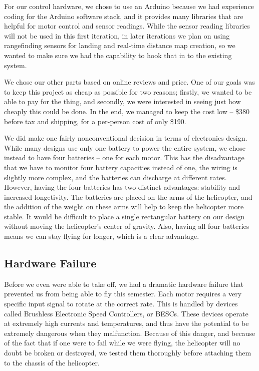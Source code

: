 For our control hardware, we chose to use an Arduino because we had
experience coding for the Arduino software stack, and it provides many
libraries that are helpful for motor control and sensor
readings. While the sensor reading libraries will not be used in this
first iteration, in later iterations we plan on using rangefinding
sensors for landing and real-time distance map creation, so we wanted
to make sure we had the capability to hook that in to the existing
system.

We chose our other parts based on online reviews and price. One of our
goals was to keep this project as cheap as possible for two reasons;
firstly, we wanted to be able to pay for the thing, and secondly, we
were interested in seeing just how cheaply this could be done. In the
end, we managed to keep the cost low -- \$380 before tax and shipping,
for a per-person cost of only \$190.

We did make one fairly nonconventional decision in terms of
electronics design. While many designs use only one battery to power
the entire system, we chose instead to have four batteries -- one for
each motor. This has the disadvantage that we have to monitor four
battery capacities instead of one, the wiring is slightly more
complex, and the batteries can discharge at different rates. However,
having the four batteries has two distinct advantages: stability and
increased longetivity. The batteries are placed on the arms of the
helicopter, and the addition of the weight on these arms will help to
keep the helicopter more stable. It would be difficult to place a
single rectangular battery on our design without moving the
helicopter's center of gravity. Also, having all four batteries means
we can stay flying for longer, which is a clear advantage.

\subsection{Hardware Failure}
\label{sec:failure}
Before we even were able to take off, we had a dramatic hardware
failure that prevented us from being able to fly this semester. Each
motor requires a very specific input signal to rotate at the correct
rate. This is handled by devices called Brushless Electronic Speed
Controllers, or BESCs. These devices operate at extremely high
currents and temperatures, and thus have the potential to be extremely
dangerous when they malfunction. Because of this danger, and because
of the fact that if one were to fail while we were flying, the
helicopter will no doubt be broken or destroyed, we tested them
thoroughly before attaching them to the chassis of the helicopter.

